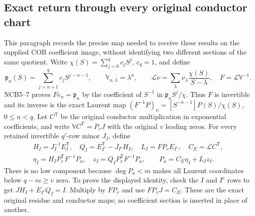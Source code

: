 \documentclass[11pt,a4paper]{article}
\begin{document}
\subsection{Exact return through every original conductor chart}
This paragraph records the precise map needed to receive these
results on the supplied COB coefficient image, without identifying
two different sections of the same quotient. Write
$\chi(S)=\sum_{j=0}^qc_jS^j$, $c_q=1$, and define
\[
\mathfrak p_n(S)=\sum_{j=n+1}^qc_jS^{j-n-1},\qquad
\mathbb V_{n,\lambda}=\lambda^n,\qquad
\mathcal L\nu=\sum_\lambda\nu_\lambda\frac{\chi(S)}{S-\lambda},
\quad F=\mathcal L\mathbb V^{-1}.
\tag{RBV26}
\]
NCB5--7 proves $Fe_n=\mathfrak p_n$ by the coefficient of $S^{-1}$
in $\mathfrak p_nS^j/\chi$. Thus $F$ is invertible and its inverse is
the exact Laurent map
$(F^{-1}P)_n=[S^{-n-1}]P(S)/\chi(S)$, $0\le n<q$.
Let $C^{\mathsf T}$ be the original conductor multiplication in
exponential coefficients, and write
$\mathbb VC^{\mathsf T}=P_vJ$ with the original $v$ leading zeros.
For every retained invertible $q'$-row minor $J_I$, define
\[
\begin{gathered}
H_I=J_I^{-1}E_I^{\mathsf T},\quad
Q_I=E_{I^c}^{\mathsf T}-J_{I^c}H_I,\quad
L_I=FP_vE_{I^c},\quad C_E=\mathcal LC^{\mathsf T},\\
\eta_I=H_IP_v^{\mathsf T}F^{-1}P_a,\quad
z_I=Q_IP_v^{\mathsf T}F^{-1}P_a,\qquad
\boxed{P_a=C_E\eta_I+L_Iz_I.}
\end{gathered}\tag{RBV27}
\]
There is no low component because $\deg P_a<m$ makes all Laurent
coordinates below $q-m\ge v$ zero. To prove the displayed identity,
check the $I$ and $I^c$ rows to get
$JH_I+E_{I^c}Q_I=I$. Multiply by $FP_v$ and use
$FP_vJ=C_E$. These are the exact original residue and conductor maps;
no coefficient section is inserted in place of another.
\end{document}
